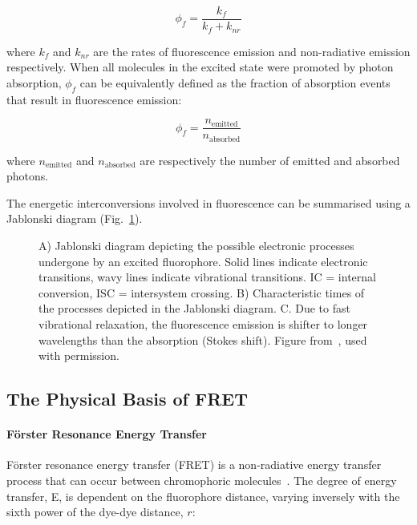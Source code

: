 \begin{equation}
\phi_f = \frac{k_f}{k_f + k_{nr}}
\label{eq:quantum_yield}
\end{equation}

where $k_f$ and $k_{nr}$ are the rates of fluorescence emission and non-radiative emission respectively. When all molecules in the excited state were promoted by photon absorption, $\phi_f$ can be equivalently defined as the fraction of absorption events that result in fluorescence emission: 


\begin{equation}
\phi_f = \frac{n_{\text{emitted}}}{n_{\text{absorbed}}}
\label{eq:quantum_yield_ratio}
\end{equation}

where $n_{\text{emitted}}$ and $n_{\text{absorbed}}$ are respectively the number of emitted and absorbed photons.

The energetic interconversions involved in fluorescence can be summarised using a Jablonski diagram (Fig.~\ref{fig:jablonski}).

\begin{figure}[!ht]
   \begin{center}
      \caption{A) Jablonski diagram depicting the possible electronic processes undergone by an excited fluorophore. Solid lines indicate electronic transitions, wavy lines indicate vibrational transitions. IC = internal conversion, ISC = intersystem crossing. B) Characteristic times of the processes depicted in the Jablonski diagram. C. Due to fast vibrational relaxation, the fluorescence emission is shifter to longer wavelengths than the absorption (Stokes shift). Figure from~\cite{Horrocks2014}, used with permission.}
      \label{fig:jablonski}
   \end{center}
\end{figure}

\subsection{The Physical Basis of FRET}
\paragraph{F\"{o}rster Resonance Energy Transfer}
F\"{o}rster resonance energy transfer (FRET) is a non-radiative energy transfer process that can occur between chromophoric molecules~\cite{forster48}. The degree of energy transfer, E, is dependent on the fluorophore distance, varying inversely with the sixth power of the dye-dye distance, $r$: 

